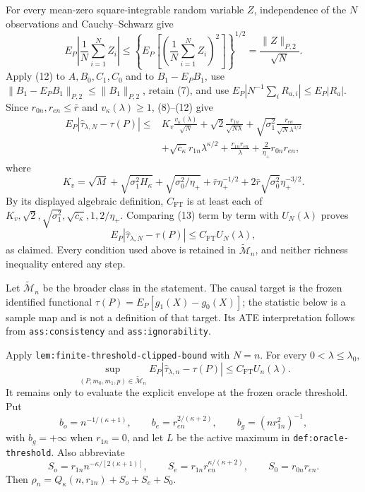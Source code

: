 For every mean-zero square-integrable random variable \(Z\), independence of
the \(N\) observations and Cauchy--Schwarz give
\[
E_P\left|\frac1N\sum_{i=1}^NZ_i\right|
\leq\left\{E_P\left[\left(\frac1N\sum_{i=1}^NZ_i\right)^2\right]\right\}^{1/2}
=\frac{\|Z\|_{P,2}}{\sqrt N}.                                     \tag{12}
\]
Apply (12) to \(A,B_0,C_1,C_0\) and to \(B_1-E_PB_1\), use
\(\|B_1-E_PB_1\|_{P,2}\leq\|B_1\|_{P,2}\), retain (7), and use
\(E_P|N^{-1}\sum_iR_{a,i}|\leq E_P|R_a|\).  Since
\(r_{0n},r_{en}\leq\bar r\) and \(v_\kappa(\lambda)\geq1\),
(8)--(12) give
\[
\begin{split}
E_P|\widehat\tau_{\lambda,N}-\tau(P)|
\leq{}&K_v\frac{v_\kappa(\lambda)}{\sqrt N}
+\sqrt2\frac{r_{1n}}{\sqrt{N\lambda}}
+\sqrt{\sigma_1^2}\frac{r_{en}}{\sqrt N\lambda^{3/2}}\\
&+\sqrt{\overline c_\kappa}r_{1n}\lambda^{\kappa/2}
+\frac{r_{1n}r_{en}}\lambda
+\frac2{\eta_+}r_{0n}r_{en},
\end{split} \tag{13}
\]
where
\[
K_v=\sqrt M+\sqrt{\sigma_1^2H_\kappa}
+\sqrt{\sigma_0^2/\eta_+}
+\bar r\eta_+^{-1/2}
+2\bar r\sqrt{\sigma_0^2}\eta_+^{-3/2}.
\]
By its displayed algebraic definition, \(C_{\mathrm{FT}}\) is at least each
of \(K_v,\sqrt2,\sqrt{\sigma_1^2},
\sqrt{\overline c_\kappa},1,2/\eta_+\).  Comparing (13) term by term with
\(U_N(\lambda)\) proves
\[
E_P|\widehat\tau_{\lambda,N}-\tau(P)|
\leq C_{\mathrm{FT}}U_N(\lambda),
\]
as claimed.  Every condition used above is retained in
\(\widetilde{\mathcal M}_n\), and neither richness inequality entered any
step.

Let \(\widetilde{\mathcal M}_n\) be the broader class in the statement.
The causal target is the frozen identified functional
\(\tau(P)=E_P[g_1(X)-g_0(X)]\); the statistic below is a sample map and is not
a definition of that target.  Its ATE interpretation follows from
\texttt{ass:consistency} and \texttt{ass:ignorability}.

Apply \texttt{lem:finite-threshold-clipped-bound} with \(N=n\).  For every
\(0<\lambda\leq\lambda_0\),
\[
\sup_{(P,m_0,m_1,p)\in\widetilde{\mathcal M}_n}
E_P|\widehat\tau_{\lambda,n}-\tau(P)|
\leq C_{\mathrm{FT}}U_n(\lambda).                                  \tag{14}
\]
It remains only to evaluate the explicit envelope at the frozen oracle
threshold.  Put
\[
b_o=n^{-1/(\kappa+1)},\qquad
b_e=r_{en}^{2/(\kappa+2)},\qquad
b_g=(nr_{1n}^2)^{-1},
\]
with \(b_g=+\infty\) when \(r_{1n}=0\), and let \(L\) be the active maximum
in \texttt{def:oracle-threshold}.  Also abbreviate
\[
S_o=r_{1n}n^{-\kappa/[2(\kappa+1)]},\qquad
S_e=r_{1n}r_{en}^{\kappa/(\kappa+2)},\qquad
S_0=r_{0n}r_{en}.
\]
Then \(\rho_n=Q_\kappa(n,r_{1n})+S_o+S_e+S_0\).

